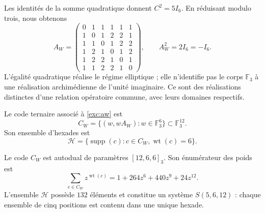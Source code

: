 Les identités de la somme quadratique donnent $C^2=5I_6$. En réduisant modulo
trois, nous obtenons
\begin{equation}
 A_W=
 \begin{pmatrix}
 0&1&1&1&1&1\\
 1&0&1&2&2&1\\
 1&1&0&1&2&2\\
 1&2&1&0&1&2\\
 1&2&2&1&0&1\\
 1&1&2&2&1&0
 \end{pmatrix},
 \qquad A_W^2=2I_6=-I_6.
 \label{exc:aw}
\end{equation}
L'égalité quadratique réalise le régime elliptique ; elle n'identifie pas le
corps $\mathbb F_3$ à une réalisation archimédienne de l'unité
imaginaire. Ce sont des réalisations distinctes d'une relation opératoire
commune, avec leurs domaines respectifs.

\begin{definition}
\label{exc:codigo}
Le code ternaire associé à \eqref{exc:aw} est
\[
 C_W=\{(w,wA_W):w\in\mathbb F_3^6\}
       \subset\mathbb F_3^{12}.
\]
Son ensemble d'hexades est
\[
 \mathcal H=
 \{\operatorname{supp}(c):c\in C_W,
                           \operatorname{wt}(c)=6\}.
\]
\end{definition}

\begin{proposition}
\label{exc:codigo-witt}
Le code $C_W$ est autodual de paramètres $[12,6,6]_3$. Son énumérateur
des poids est
\begin{equation}
 \sum_{c\in C_W}z^{\operatorname{wt}(c)}
   =1+264z^6+440z^9+24z^{12}.
 \label{exc:enumerador}
\end{equation}
L'ensemble $\mathcal H$ possède $132$ éléments et constitue un système
$S(5,6,12)$ : chaque ensemble de cinq positions est contenu dans une
unique hexade.
\end{proposition}

